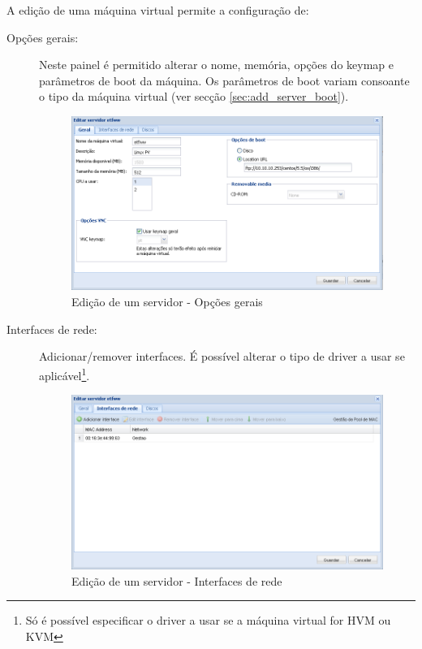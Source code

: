 A edição de uma máquina virtual permite a configuração de:
\begin{description}
	\item[Opções gerais:] Neste painel é permitido alterar o nome, memória, opções do keymap e parâmetros de boot da máquina.
        Os parâmetros de boot variam consoante o tipo da máquina virtual (ver secção \ref{sec:add_server_boot}).
		\begin{figure}[H]
        		\begin{center}
		        \includegraphics[scale=0.5]{screenshots/server_edit_general.png}
        		\caption{Edição de um servidor - Opções gerais}
	        	\label{fig:server_edit_general}
	        	\end{center}
		\end{figure}

	\item[Interfaces de rede:] Adicionar/remover interfaces. É possível alterar o tipo de driver a usar se aplicável\footnote{Só é possível especificar o driver a usar se a máquina virtual for HVM ou KVM}.
		\begin{figure}[H]
        		\begin{center}
		        \includegraphics[scale=0.5]{screenshots/server_edit_interfaces.png}
        		\caption{Edição de um servidor - Interfaces de rede}
	        	\label{fig:server_edit_interfaces}
	        	\end{center}
		\end{figure}


\end{description}

